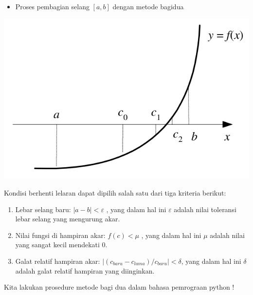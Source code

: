 \documentclass[pdflatex,compress]{beamer}
\begin{document}
\begin{frame}
	\begin{itemize}
		\item Proses pembagian selang $ [a, b] $ dengan metode bagidua
	\end{itemize}
	\begin{center}
		\includegraphics[width=0.7\linewidth]{img/img06.png}
	\end{center}
\end{frame}

\begin{frame}
	Kondisi berhenti lelaran dapat dipilih salah satu dari tiga kriteria berikut:
	\begin{enumerate}
		\item Lebar selang baru: $|a - b| < \varepsilon$ , yang dalam hal ini $\varepsilon$ adalah nilai toleransi lebar selang yang mengurung akar.
		\item Nilai fungsi di hampiran akar: $ f(c) < \mu $ , yang dalam hal ini $\mu$ adalah nilai yang sangat kecil mendekati 0.
		\item Galat relatif hampiran akar: $ |(c_{baru} - c_{lama}) / c_{baru}| < \delta $, yang dalam hal ini $\delta$ adalah galat relatif hampiran yang diinginkan.
	\end{enumerate}
\end{frame}

\begin{frame}
	Kita lakukan prosedure metode bagi dua dalam bahasa pemrograan python !
\end{frame}
\end{document}

